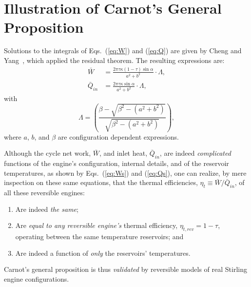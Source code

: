 \section{Illustration of Carnot's General Proposition}

    Solutions to the integrals of Eqs.~(\ref{eq:W}) and (\ref{eq:Q})  are  given  by  Cheng  and
    Yang~\cite{2012-ChengCH+YangHS-ApEnergy}, which applied the residual theorem. The  resulting
    expressions are:
    \begin{align}
        \label{eq:Ws}
        \bar{W} &= \frac{2\pi\tau\kappa(1 - \tau)\sin\alpha}{a^2 + b^2}\cdot\Lambda,\\
        \label{eq:Qs}
        \bar{Q}_{in} &= \frac{2\pi\tau\kappa\sin\alpha}{a^2 + b^2}\cdot\Lambda,
    \end{align}
    \noindent with
    \begin{equation}
        \label{eq:Lamda}
        \Lambda = \left(
                \frac{\beta - \sqrt{\beta^2 - (a^2 + b^2)}}{\sqrt{\beta^2 - (a^2 + b^2)}}
            \right),
    \end{equation}
    \noindent where $a$, $b$, and $\beta$ are configuration dependent expressions.

    Although the  cycle  net  work,  $\bar{W}$,  and  inlet  heat,  $\bar{Q}_{in}$,  are  indeed
    \emph{complicated} functions of the engine's configuration, internal  details,  and  of  the
    reservoir temperatures, as shown by Eqs.~(\ref{eq:Ws}) and (\ref{eq:Qs}), one  can  realize,
    by mere inspection on these same equations, that the thermal  efficiencies,  $\eta_t  \equiv
    \bar{W} / \bar{Q}_{in}$, of all these reversible engines:
    \begin{enumerate}
        \item Are  indeed  \emph{the  same};
        \item Are \emph{equal to any reversible engine's} thermal efficiency, $\eta_{t,rev} =  1
            - \tau$, operating between the same temperature reservoirs; and
        \item Are indeed a function of \emph{only} the reservoirs' temperatures.
    \end{enumerate}

    Carnot's general proposition is thus \emph{validated} by reversible models of real  Stirling
    engine configurations.


